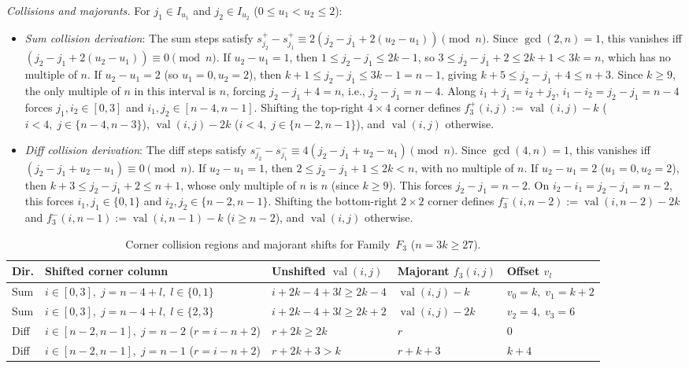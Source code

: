 \documentclass[10pt,a4paper]{article}
\theoremstyle{remark}
\newcommand{\val}{\operatorname{val}}
\begin{document}
\emph{Collisions and majorants.}
For $j_1 \in I_{u_1}$ and $j_2 \in I_{u_2}$ ($0 \le u_1 < u_2 \le 2$):
\begin{itemize}[nosep]
  \item \emph{Sum collision derivation}: The sum steps satisfy $s^+_{j_2} - s^+_{j_1} \equiv 2(j_2 - j_1 + 2(u_2 - u_1)) \pmod n$.
  Since $\gcd(2,n) = 1$, this vanishes iff $(j_2 - j_1 + 2(u_2 - u_1)) \equiv 0 \pmod n$.
  If $u_2 - u_1 = 1$, then $1 \le j_2 - j_1 \le 2k - 1$, so $3 \le j_2 - j_1 + 2 \le 2k + 1 < 3k = n$, which has no
  multiple of $n$.
  If $u_2 - u_1 = 2$ (so $u_1 = 0, u_2 = 2$), then $k + 1 \le j_2 - j_1 \le 3k - 1 = n - 1$, giving
  $k + 5 \le j_2 - j_1 + 4 \le n + 3$. Since $k \ge 9$, the only multiple of $n$ in this interval is $n$, forcing
  $j_2 - j_1 + 4 = n$, i.e., $j_2 - j_1 = n - 4$.
  Along $i_1 + j_1 = i_2 + j_2$, $i_1 - i_2 = j_2 - j_1 = n - 4$ forces $j_1, i_2 \in [0,3]$ and $i_1, j_2 \in [n-4,n-1]$.
  Shifting the top-right $4 \times 4$ corner defines $f^+_3(i,j) := \val(i,j) - k$ ($i < 4, \; j \in \{n-4,n-3\}$),
  $\val(i,j) - 2k$ ($i < 4, \; j \in \{n-2,n-1\}$), and $\val(i,j)$ otherwise.
  \item \emph{Diff collision derivation}: The diff steps satisfy $s^-_{j_2} - s^-_{j_1} \equiv 4(j_2 - j_1 + u_2 - u_1) \pmod n$.
  Since $\gcd(4,n) = 1$, this vanishes iff $(j_2 - j_1 + u_2 - u_1) \equiv 0 \pmod n$.
  If $u_2 - u_1 = 1$, then $2 \le j_2 - j_1 + 1 \le 2k < n$, with no multiple of $n$.
  If $u_2 - u_1 = 2$ ($u_1 = 0, u_2 = 2$), then $k + 3 \le j_2 - j_1 + 2 \le n + 1$, whose only multiple of $n$ is $n$
  (since $k \ge 9$). This forces $j_2 - j_1 = n - 2$.
  On $i_2 - i_1 = j_2 - j_1 = n - 2$, this forces $i_1, j_1 \in \{0,1\}$ and $i_2, j_2 \in \{n-2,n-1\}$.
  Shifting the bottom-right $2 \times 2$ corner defines $f^-_3(i,n-2) := \val(i,n-2) - 2k$ and
  $f^-_3(i,n-1) := \val(i,n-1) - k$ ($i \ge n - 2$), and $\val(i,j)$ otherwise.
\end{itemize}

\begin{table}[htbp]
\centering
\footnotesize
\begin{tabular}{@{}lllll@{}}
\toprule
Dir. & Shifted corner column & Unshifted $\val(i,j)$ & Majorant $f_3(i,j)$ & Offset $v_l$ \\
\midrule
Sum & $i \in [0,3], \; j = n - 4 + l, \; l \in \{0,1\}$ & $i + 2k - 4 + 3l \ge 2k - 4$ & $\val(i,j) - k$ & $v_0 = k, \; v_1 = k + 2$ \\
Sum & $i \in [0,3], \; j = n - 4 + l, \; l \in \{2,3\}$ & $i + 2k - 4 + 3l \ge 2k + 2$ & $\val(i,j) - 2k$ & $v_2 = 4, \; v_3 = 6$ \\
Diff & $i \in [n-2,n-1], \; j = n - 2$ ($r = i - n + 2$) & $r + 2k \ge 2k$ & $r$ & $0$ \\
Diff & $i \in [n-2,n-1], \; j = n - 1$ ($r = i - n + 2$) & $r + 2k + 3 > k$ & $r + k + 3$ & $k + 4$ \\
\bottomrule
\end{tabular}
\caption{Corner collision regions and majorant shifts for Family~$F_3$ ($n = 3k \ge 27$).}
\label{tab:fam3}
\end{table}
\end{document}
